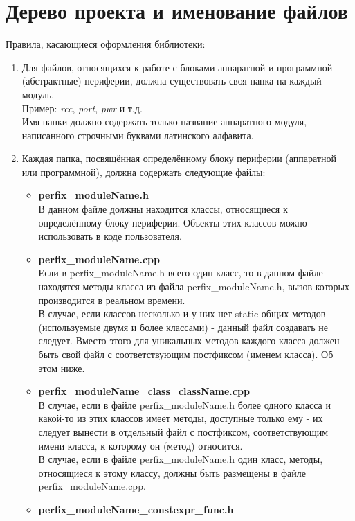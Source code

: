 \section{Дерево проекта и именование файлов}\label{dn:0}
Правила, касающиеся оформления библиотеки:
\begin{enumerate}
	\item Для файлов, относящихся к работе с блоками аппаратной и программной (абстрактные) периферии, должна существовать своя папка на каждый модуль.\\
	Пример: \textit{rcc}, \textit{port}, \textit{pwr} и т.д.\\
	Имя папки должно содержать только название аппаратного модуля, написанного строчными буквами латинского алфавита.
	
	\item Каждая папка, посвящённая определённому блоку периферии (аппаратной или программной), должна содержать следующие файлы:
	\begin{itemize}
		\item \textbf{perfix\_moduleName.h}\\
		В данном файле должны находится классы, относящиеся к определённому блоку периферии. Объекты этих классов можно использовать в коде пользователя.
		\item \textbf{perfix\_moduleName.cpp}\\
		Если в perfix\_moduleName.h всего один класс, то в данном файле находятся методы класса из файла perfix\_moduleName.h, вызов которых производится в реальном времени.\\
		В случае, если классов несколько и у них нет static общих методов (используемые двумя и более классами) - данный файл создавать не следует. Вместо этого для уникальных методов каждого класса должен быть свой файл с соответствующим постфиксом (именем класса). Об этом ниже.
		\item \textbf{perfix\_moduleName\_class\_className.cpp}\\
		В случае, если в файле perfix\_moduleName.h более одного класса и какой-то из этих классов имеет методы, доступные только ему - их следует вынести в отдельный файл с постфиксом, соответствующим имени класса, к которому он (метод) относится.\\
		В случае, если в файле perfix\_moduleName.h один класс, методы, относящиеся к этому классу, должны быть размещены в файле perfix\_\-moduleName.cpp.
		\item \textbf{perfix\_moduleName\_constexpr\_func.h}\\

\end{itemize}
\end{enumerate}

